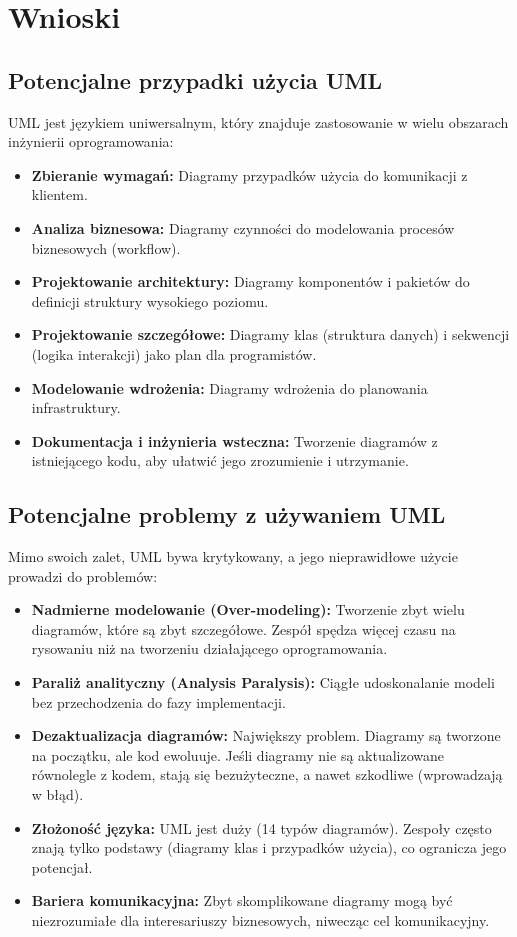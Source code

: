 \documentclass[a4paper,12pt]{article}
\begin{document}
\section{Wnioski}

\subsection{Potencjalne przypadki użycia UML}

UML jest językiem uniwersalnym, który znajduje zastosowanie w wielu obszarach inżynierii oprogramowania:
\begin{itemize}
    \item \textbf{Zbieranie wymagań:} Diagramy przypadków użycia do komunikacji z klientem.
    \item \textbf{Analiza biznesowa:} Diagramy czynności do modelowania procesów biznesowych (workflow).
    \item \textbf{Projektowanie architektury:} Diagramy komponentów i pakietów do definicji struktury wysokiego poziomu.
    \item \textbf{Projektowanie szczegółowe:} Diagramy klas (struktura danych) i sekwencji (logika interakcji) jako plan dla programistów.
    \item \textbf{Modelowanie wdrożenia:} Diagramy wdrożenia do planowania infrastruktury.
    \item \textbf{Dokumentacja i inżynieria wsteczna:} Tworzenie diagramów z istniejącego kodu, aby ułatwić jego zrozumienie i utrzymanie.
\end{itemize}

\subsection{Potencjalne problemy z używaniem UML}

Mimo swoich zalet, UML bywa krytykowany, a jego nieprawidłowe użycie prowadzi do problemów:
\begin{itemize}
    \item \textbf{Nadmierne modelowanie (Over-modeling):} Tworzenie zbyt wielu diagramów, które są zbyt szczegółowe. Zespół spędza więcej czasu na rysowaniu niż na tworzeniu działającego oprogramowania.
    \item \textbf{Paraliż analityczny (Analysis Paralysis):} Ciągłe udoskonalanie modeli bez przechodzenia do fazy implementacji.
    \item \textbf{Dezaktualizacja diagramów:} Największy problem. Diagramy są tworzone na początku, ale kod ewoluuje. Jeśli diagramy nie są aktualizowane równolegle z kodem, stają się bezużyteczne, a nawet szkodliwe (wprowadzają w błąd).
    \item \textbf{Złożoność języka:} UML jest duży (14 typów diagramów). Zespoły często znają tylko podstawy (diagramy klas i przypadków użycia), co ogranicza jego potencjał.
    \item \textbf{Bariera komunikacyjna:} Zbyt skomplikowane diagramy mogą być niezrozumiałe dla interesariuszy biznesowych, niwecząc cel komunikacyjny.
\end{itemize}
\end{document}
